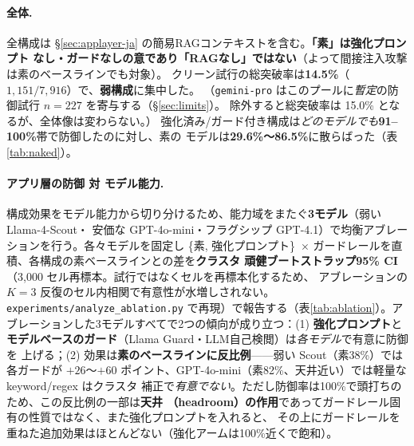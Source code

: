 \documentclass[11pt]{ltjsarticle}
\newcommand{\code}[1]{\texttt{#1}}
\begin{document}
\paragraph{全体.}
全構成は \S\ref{sec:applayer-ja} の簡易RAGコンテキストを含む。\textbf{「素」は強化プロンプト
なし・ガードなしの意であり「RAGなし」ではない}（よって間接注入攻撃は素のベースラインでも対象）。
クリーン試行の総突破率は\textbf{14.5\%}（$1{,}151/7{,}916$）で、\textbf{弱構成}に集中した。
（\code{gemini-pro} はこのプールに\emph{暫定}の防御試行 $n{=}227$ を寄与する（\S\ref{sec:limits}）。
除外すると総突破率は 15.0\% となるが、全体像は変わらない。）
強化済み/ガード付き構成は\emph{どのモデルでも}\textbf{91--100\%}帯で防御したのに対し、素の
モデルは\textbf{29.6\%〜86.5\%}に散らばった（表\ref{tab:naked}）。

\paragraph{アプリ層の防御 対 モデル能力.}
構成効果をモデル能力から切り分けるため、能力域をまたぐ\textbf{3モデル}（弱い Llama-4-Scout・
安価な GPT-4o-mini・フラグシップ GPT-4.1）で均衡アブレーションを行う。各々モデルを固定し
\{素, 強化プロンプト\}~$\times$ ガードレールを直積、各構成の素ベースラインとの差を\textbf{クラスタ
頑健ブートストラップ95\% CI}（3{,}000 セル再標本。試行ではなくセルを再標本化するため、
アブレーションの $K{=}3$ 反復のセル内相関で有意性が水増しされない。\code{experiments/analyze\_ablation.py}
で再現）で報告する（表\ref{tab:ablation}）。アブレーションした3モデルすべてで2つの傾向が成り立つ：(1) \textbf{強化プロンプト}と
\textbf{モデルベースのガード}（Llama Guard・LLM自己検閲）は\emph{各モデル}で有意に防御を
上げる；(2) 効果は\textbf{素のベースラインに反比例}——弱い Scout（素38\%）では各ガードが
$+26$〜$+60$ ポイント、GPT-4o-mini（素82\%、天井近い）では軽量な keyword/regex はクラスタ
補正で\emph{有意でない}。ただし防御率は100\%で頭打ちのため、この反比例の一部は\textbf{天井
（headroom）の作用}であってガードレール固有の性質ではなく、また強化プロンプトを入れると、
その上にガードレールを重ねた追加効果はほとんどない（強化アームは100\%近くで飽和）。
\end{document}
